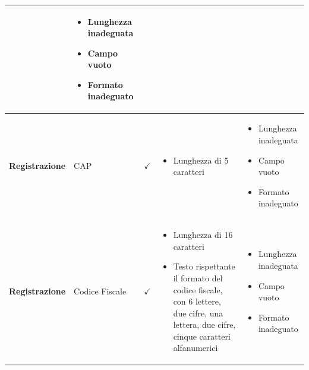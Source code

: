 \documentclass[12pt]{article}
\begin{document}
\begin{longtable}{|l|l|l|l|l|}
\begin{minipage}{3.5cm}
\begin{itemize}
 \end{itemize}
 \vspace{5pt}
 \end{minipage} & \begin{minipage}{4cm}
 \vspace{5pt}
 \begin{itemize}
 \item Lunghezza inadeguata
 \item Campo vuoto
 \item Formato inadeguato
 \end{itemize}
 \vspace{5pt}
 \end{minipage} \\ \hline
 
\textbf{Registrazione} & CAP & $\checkmark$ & \begin{minipage}{3.5cm}
 \vspace{5pt}
 \begin{itemize}
 \item Lunghezza di 5 caratteri
 
 \end{itemize}
 \vspace{5pt}
 \end{minipage} & \begin{minipage}{4cm}
 \vspace{5pt}
 \begin{itemize}
 \item Lunghezza inadeguata
 \item Campo vuoto
 \item Formato inadeguato
 \end{itemize}
 \vspace{5pt}
 \end{minipage} \\ \hline
 
 \textbf{Registrazione} & Codice Fiscale & $\checkmark$ & \begin{minipage}{3.5cm}
 \vspace{5pt}
 \begin{itemize}
 \item Lunghezza di 16 caratteri
 \item Testo rispettante il formato del codice fiscale, con 6 lettere, due cifre, una lettera, due cifre, cinque caratteri alfanumerici
 \end{itemize}
 \vspace{5pt}
 \end{minipage} & \begin{minipage}{4cm}
 \vspace{5pt}
 \begin{itemize}
 \item Lunghezza inadeguata
 \item Campo vuoto
 \item Formato inadeguato
 \end{itemize}
 \vspace{5pt}
 \end{minipage} \\ \hline
 
 \end{longtable}
 \newpage
 
\end{document}
